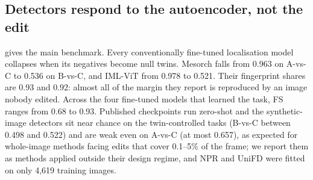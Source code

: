 \subsection{Detectors respond to the autoencoder, not the edit}
\label{sec:confound}

 gives the main benchmark.
Every conventionally fine-tuned localisation model collapses when its negatives become null twins.
Mesorch falls from 0.963 on A-vs-C to 0.536 on B-vs-C, %
and IML-ViT from 0.978 to 0.521. %
Their fingerprint shares are 0.93 and 0.92: almost all of the margin they report is reproduced by an image nobody edited. %
Across the four fine-tuned models that learned the task, FS ranges from 0.68 to 0.93. %
Published checkpoints run zero-shot and the synthetic-image detectors sit near chance on the twin-controlled tasks (B-vs-C between 0.498 and 0.522) %
and are weak even on A-vs-C (at most 0.657), %
as expected for whole-image methods facing edits that cover 0.1--5\% of the frame; %
we report them as methods applied outside their design regime, and NPR and UniFD were fitted on only 4,619 training images. %

